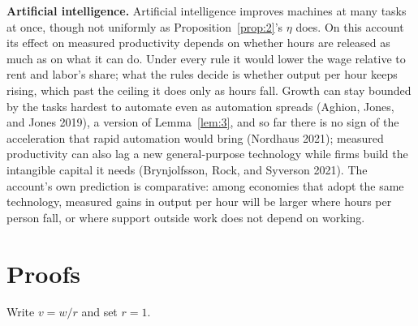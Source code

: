\documentclass[12pt]{article}
\theoremstyle{plain}
\begin{document}
\textbf{Artificial intelligence.} Artificial intelligence improves machines at many tasks at once, though not uniformly as Proposition~\ref{prop:2}'s $\eta$ does. On this account its effect on measured productivity depends on whether hours are released as much as on what it can do. Under every rule it would lower the wage relative to rent and labor's share; what the rules decide is whether output per hour keeps rising, which past the ceiling it does only as hours fall. Growth can stay bounded by the tasks hardest to automate even as automation spreads (Aghion, Jones, and Jones 2019), a version of Lemma~\ref{lem:3}, and so far there is no sign of the acceleration that rapid automation would bring (Nordhaus 2021); measured productivity can also lag a new general-purpose technology while firms build the intangible capital it needs (Brynjolfsson, Rock, and Syverson 2021). The account's own prediction is comparative: among economies that adopt the same technology, measured gains in output per hour will be larger where hours per person fall, or where support outside work does not depend on working.

\appendix
{}

\section{Proofs}\label{app:A}

Write $v=w/r$ and set $r=1$.
\end{document}
